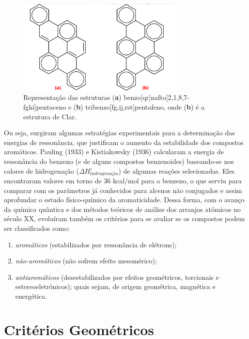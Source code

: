 \begin{figure}[htb]
	\caption{\label{fig:exampledd}Representação das estruturas (\textbf{a}) benzo[qr]nafto[2,1,8,7-fghi]pentaceno e (\textbf{b}) tribenzo[fg,ij,rst]pentafeno, onde (\textbf{b}) é a estrutura de Clar.}
	\begin{center}
		\includegraphics[width=0.75\textwidth]{images/14.png}
	\end{center}
\end{figure}

Ou seja, surgiram algumas estratégias experimentais para a determinação das energias de ressonância, que justificam o aumento da estabilidade dos compostos aromáticos. Pauling (1933) \autocite{Pauling1933, Pauling1936} e Kistiakowsky (1936) calcularam a energia de ressonância do benzeno (e de alguns compostos benzenoides) baseando-se nos calores de hidrogenação ($\Delta H^{\circ}_{\textit{hidrogenação}}$) de algumas reações selecionadas. Eles encontraram valores em torno de 36 kcal/mol para o benzeno, o que serviu para comparar com os parâmetros já conhecidos para alcenos não conjugados e assim aprofundar o estudo físico-químico da aromaticidade. Dessa forma, com o avanço da química quântica e dos métodos teóricos de análise dos arranjos atômicos no século XX, evoluíram também os critérios para se avaliar se os compostos podem ser classificados como:

\begin{enumerate}
    \item \textit{aromáticos} (estabilizados por ressonância de elétrons);
    \item \textit{não-aromáticos} (não sofrem efeito mesomérico);
    \item \textit{antiaromáticos} (desestabilizados por efeitos geométricos, torcionais e estereoeletrônicos); quais sejam, de origem geométrica, magnética e energética. 
\end{enumerate}

\section{Critérios Geométricos}

